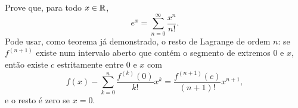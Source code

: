 \documentclass[11pt,a4paper]{article}
\begin{document}
\vspace{7cm}

\begin{exercicio}
Prove que, para todo \(x\in\mathbb{R}\),
\[
e^x=\sum_{n=0}^\infty\frac{x^n}{n!}.
\]
Pode usar, como teorema já demonstrado, o resto de Lagrange de ordem \(n\): se \(f^{(n+1)}\) existe num intervalo aberto que contém o segmento de extremos \(0\) e \(x\), então existe \(c\) estritamente entre \(0\) e \(x\) com
\[
f(x)-\sum_{k=0}^n\frac{f^{(k)}(0)}{k!}x^k=\frac{f^{(n+1)}(c)}{(n+1)!}x^{n+1},
\]
e o resto é zero se \(x=0\).
\end{exercicio}

\vspace{7cm}
\end{document}
